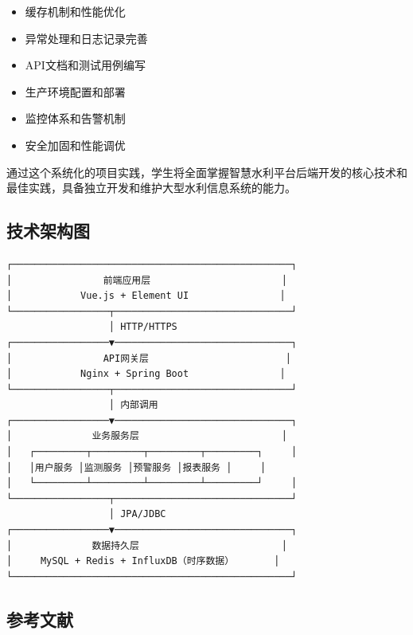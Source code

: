 
\begin{itemize}
\tightlist
\item
  缓存机制和性能优化
\item
  异常处理和日志记录完善
\item
  API文档和测试用例编写
\end{itemize}


\begin{itemize}
\tightlist
\item
  生产环境配置和部署
\item
  监控体系和告警机制
\item
  安全加固和性能调优
\end{itemize}

通过这个系统化的项目实践，学生将全面掌握智慧水利平台后端开发的核心技术和最佳实践，具备独立开发和维护大型水利信息系统的能力。

\hypertarget{ux6280ux672fux67b6ux6784ux56fe}{%
\subsection{技术架构图}\label{ux6280ux672fux67b6ux6784ux56fe}}

\begin{lstlisting}
┌─────────────────────────────────────────────────┐
│                前端应用层                       │
│            Vue.js + Element UI                │
└─────────────────┬───────────────────────────────┘
                  │ HTTP/HTTPS
┌─────────────────▼───────────────────────────────┐
│                API网关层                        │
│            Nginx + Spring Boot                │
└─────────────────┬───────────────────────────────┘
                  │ 内部调用
┌─────────────────▼───────────────────────────────┐
│              业务服务层                         │
│   ┌─────────┬─────────┬─────────┬─────────┐     │
│   │用户服务 │监测服务 │预警服务 │报表服务 │     │
│   └─────────┴─────────┴─────────┴─────────┘     │
└─────────────────┬───────────────────────────────┘
                  │ JPA/JDBC
┌─────────────────▼───────────────────────────────┐
│              数据持久层                         │
│     MySQL + Redis + InfluxDB（时序数据）       │
└─────────────────────────────────────────────────┘
\end{lstlisting}

\hypertarget{ux53c2ux8003ux6587ux732e}{%
\subsection{参考文献}\label{ux53c2ux8003ux6587ux732e}}

